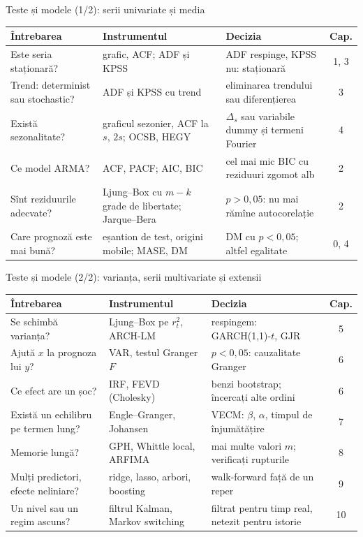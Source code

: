 \begin{frame}{Teste și modele (1/2): serii univariate și media}
\itemsize{\small}
\begin{center}
\footnotesize
\begin{tabular}{>{\raggedright\arraybackslash}p{3.5cm}>{\raggedright\arraybackslash}p{3.5cm}>{\raggedright\arraybackslash}p{3.6cm}c}
\toprule
\textbf{Întrebarea} & \textbf{Instrumentul} & \textbf{Decizia} & \textbf{Cap.} \\
\midrule
Este seria staționară? & grafic, ACF; ADF și KPSS & ADF respinge, KPSS nu: staționară & 1, 3 \\
Trend: determinist sau stochastic? & ADF și KPSS cu trend & eliminarea trendului sau diferențierea & 3 \\
Există sezonalitate? & graficul sezonier, ACF la $s$, $2s$; OCSB, HEGY & $\Delta_s$ sau variabile dummy și termeni Fourier & 4 \\
Ce model ARMA? & ACF, PACF; AIC, BIC & cel mai mic BIC cu reziduuri zgomot alb & 2 \\
Sînt reziduurile adecvate? & Ljung--Box cu $m - k$ grade de libertate; Jarque--Bera & $p > 0{,}05$: nu mai rămîne autocorelație & 2 \\
Care prognoză este mai bună? & eșantion de test, origini mobile; MASE, DM & DM cu $p < 0{,}05$; altfel egalitate & 0, 4 \\
\bottomrule
\end{tabular}
\end{center}
\end{frame}

\begin{frame}{Teste și modele (2/2): varianța, serii multivariate și extensii}
\itemsize{\small}
\begin{center}
\footnotesize
\begin{tabular}{>{\raggedright\arraybackslash}p{3.5cm}>{\raggedright\arraybackslash}p{3.5cm}>{\raggedright\arraybackslash}p{3.6cm}c}
\toprule
\textbf{Întrebarea} & \textbf{Instrumentul} & \textbf{Decizia} & \textbf{Cap.} \\
\midrule
Se schimbă varianța? & Ljung--Box pe $r_t^2$, ARCH-LM & respingem: GARCH(1,1)-$t$, GJR & 5 \\
Ajută $x$ la prognoza lui $y$? & VAR, testul Granger $F$ & $p < 0{,}05$: cauzalitate Granger & 6 \\
Ce efect are un șoc? & IRF, FEVD (Cholesky) & benzi bootstrap; încercați alte ordini & 6 \\
Există un echilibru pe termen lung? & Engle--Granger, Johansen & VECM: $\beta$, $\alpha$, timpul de înjumătățire & 7 \\
Memorie lungă? & GPH, Whittle local, ARFIMA & mai multe valori $m$; verificați rupturile & 8 \\
Mulți predictori, efecte neliniare? & ridge, lasso, arbori, boosting & walk-forward față de un reper & 9 \\
Un nivel sau un regim ascuns? & filtrul Kalman, Markov switching & filtrat pentru timp real, netezit pentru istorie & 10 \\
\bottomrule
\end{tabular}
\end{center}
\end{frame}

